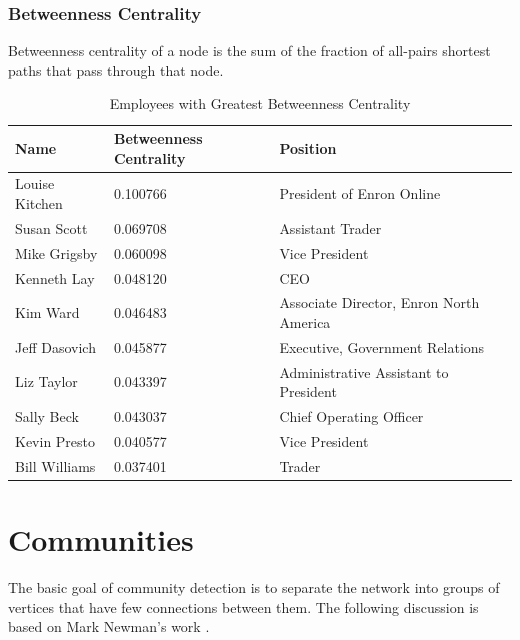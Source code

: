 \documentclass[12pt]{article}
\begin{document}
	\subsubsection{Betweenness Centrality} Betweenness centrality of a node is the sum of the fraction of all-pairs shortest paths that pass through that node.
	        
        \begin{table}[h]
        \caption{Employees with Greatest Betweenness Centrality}
        \centering
        \begin{tabular}{|l|l|l|}
        \hline
        \textbf{Name}  & \textbf{Betweenness Centrality} & \textbf{Position}                       \\ \hline
        Louise Kitchen & 0.100766                        & President of Enron Online               \\ \hline
        Susan Scott    & 0.069708                        & Assistant Trader                        \\ \hline
        Mike Grigsby   & 0.060098                        & Vice President                                        \\ \hline
        Kenneth Lay    & 0.048120                        & CEO                                     \\ \hline
        Kim Ward       & 0.046483                        & Associate Director, Enron North America \\ \hline
        Jeff Dasovich  & 0.045877                        & Executive, Government Relations         \\ \hline
        Liz Taylor     & 0.043397                        & Administrative Assistant to President   \\ \hline
        Sally Beck     & 0.043037                        & Chief Operating Officer                 \\ \hline
        Kevin Presto   & 0.040577                        & Vice President                          \\ \hline
        Bill Williams  & 0.037401                        & Trader                                  \\ \hline
        \end{tabular}
        \end{table}

\section{Communities} The basic goal of community detection is to separate the network into groups of vertices that have few connections between them. The following discussion is based on Mark Newman's work \cite{newman}. 
\end{document}
